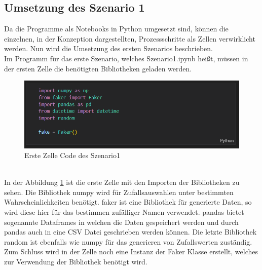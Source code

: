 \begin{onehalfspace}
\subsection{Umsetzung des Szenario 1}
\label{umsetzungsz1}
Da die Programme als Notebooks in Python umgesetzt sind, können die einzelnen, in der Konzeption dargestellten, Prozessschritte als Zellen verwirklicht werden. Nun wird die Umsetzung des ersten Szenarios beschrieben.\\
Im Programm für das erste Szenario, welches \glqq{}Szenario1.ipynb\grqq{} heißt, müssen in der ersten Zelle die benötigten Bibliotheken geladen werden.
\begin{figure}[h]
    \centering
    \includegraphics{Diagramme/Sz1_Cell1.PNG}
    \caption{Erste Zelle Code des Szenario1}
    \label{fig:Zelle1S1}
\end{figure}\\
In der Abbildung \ref{fig:Zelle1S1} ist die erste Zelle mit den Importen der Bibliotheken zu sehen. Die Bibliothek \glqq{}numpy\grqq{} wird für Zufallsauswahlen unter bestimmten Wahrscheinlichkeiten benötigt. \glqq{}faker\grqq{} ist eine Bibliothek für generierte Daten, so wird diese hier für das bestimmen zufälliger Namen verwendet. \glqq{}pandas\grqq{} bietet sogenannte Dataframes in welchen die Daten gespeichert werden und durch \glqq{}pandas\grqq{} auch in eine CSV Datei geschrieben werden können. Die letzte Bibliothek \glqq{}random\grqq{} ist ebenfalls wie \glqq{}numpy\grqq{} für das generieren von Zufallswerten zuständig. Zum Schluss wird in der Zelle noch eine Instanz der Faker Klasse erstellt, welches zur Verwendung der Bibliothek benötigt wird.\\

\end{onehalfspace}
